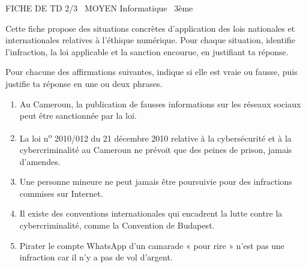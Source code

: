 \documentclass[11pt]{article}
\begin{document}
\begin{tcolorbox}[enhanced,colback=popink,colframe=popink,arc=10pt,boxrule=0pt,left=12pt,right=12pt,top=9pt,bottom=9pt]
{\color{white}\popxbold\small FICHE DE TD 2/3 \textbullet\ MOYEN \hfill Informatique \textbullet\ 3ème\par}
\end{tcolorbox}
\vspace{4pt}
Cette fiche propose des situations concrètes d'application des lois nationales et internationales relatives à l'éthique numérique. Pour chaque situation, identifie l'infraction, la loi applicable et la sanction encourue, en justifiant ta réponse.

\begin{exercice}
Pour chacune des affirmations suivantes, indique si elle est vraie ou fausse, puis justifie ta réponse en une ou deux phrases.
\begin{enumerate}
\item Au Cameroun, la publication de fausses informations sur les réseaux sociaux peut être sanctionnée par la loi.
\item La loi n\textsuperscript{o} 2010/012 du 21 décembre 2010 relative à la cybersécurité et à la cybercriminalité au Cameroun ne prévoit que des peines de prison, jamais d'amendes.
\item Une personne mineure ne peut jamais être poursuivie pour des infractions commises sur Internet.
\item Il existe des conventions internationales qui encadrent la lutte contre la cybercriminalité, comme la Convention de Budapest.
\item Pirater le compte WhatsApp d'un camarade « pour rire » n'est pas une infraction car il n'y a pas de vol d'argent.
\end{enumerate}
\end{exercice}
\end{document}
